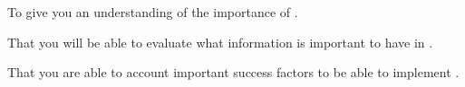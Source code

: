 \item To give you an understanding of the importance of .
\item That you will be able to evaluate what information is important to have in
  .
\item That you are able to account important success factors to be able to
  implement .

